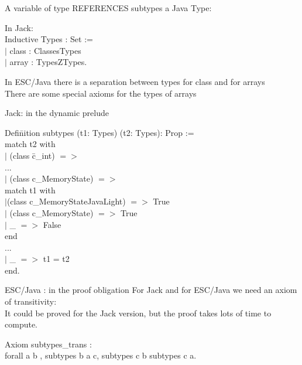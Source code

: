 A variable of type REFERENCES subtypes a Java Type:
\blist
\item In Jack:\\
{\purple Inductive} Types : Set :=\\
$|$    class : Classes\rarrow Types\\
$|$ array : Types\rarrow Z\rarrow Types.
\item In ESC/Java there is a separation between types for class and
for arrays\\
\rarrow There are some {\purple special axioms} for the types of arrays
\elist


\small
\blist
\item Jack: in the dynamic prelude 
\begin{tabbing}
{\purple Defi}\={\purple nition} subtypes (t1: Types) (t2: Types): Prop :=\+\\
   {\purple match} t2 {\purple with}\\
    $|$ (class \=c\_int) $=>$\+ \\
       ...\-\\
    $|$ (class c\_MemoryState) $=>$\+\\ {\purple match} t1 {\purple with}\\
        $|$(class c\_MemoryStateJavaLight) $=>$ True\\
        $|$ (class c\_MemoryState) $=>$ True\\
        $|$ \_ $=>$ False\\
        {\purple end}\\
       ... \-\\
    $|$ \_ $=>$ t1 = t2\\
    {\purple end}.
\end{tabbing}
\elist
{} \small
\blist 
\item ESC/Java : in the proof obligation
\elist
For Jack and for ESC/Java we need an  {\purple axiom of transitivity}:\\
\rarrow It could be proved for the Jack version, but the proof 
takes lots of time to compute.

 {\purple Axiom} subtypes\_trans :\\
 {\purple forall} a b , subtypes b a   c, subtypes c b \rarrow subtypes  c a. 

